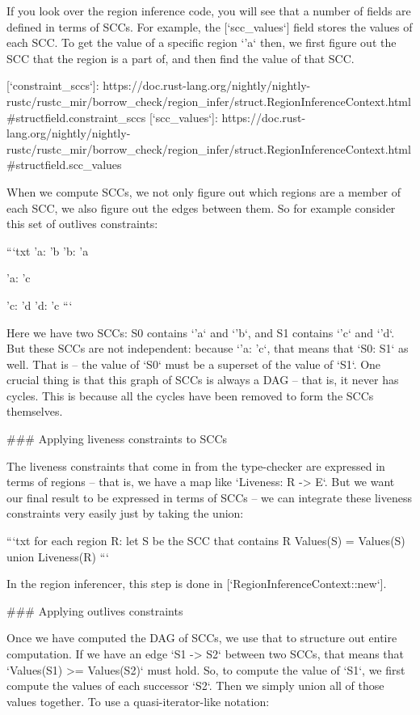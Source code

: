 \documentclass[12pt, a4paper]{article}
\begin{document}
If you look over the region inference code, you will see that a number
of fields are defined in terms of SCCs. For example, the
[`scc_values`] field stores the values of each SCC. To get the value
of a specific region `'a` then, we first figure out the SCC that the
region is a part of, and then find the value of that SCC.

[`constraint_sccs`]: https://doc.rust-lang.org/nightly/nightly-rustc/rustc_mir/borrow_check/region_infer/struct.RegionInferenceContext.html#structfield.constraint_sccs
[`scc_values`]: https://doc.rust-lang.org/nightly/nightly-rustc/rustc_mir/borrow_check/region_infer/struct.RegionInferenceContext.html#structfield.scc_values

When we compute SCCs, we not only figure out which regions are a
member of each SCC, we also figure out the edges between them. So for example
consider this set of outlives constraints:

```txt
'a: 'b
'b: 'a

'a: 'c

'c: 'd
'd: 'c
```

Here we have two SCCs: S0 contains `'a` and `'b`, and S1 contains `'c`
and `'d`.  But these SCCs are not independent: because `'a: 'c`, that
means that `S0: S1` as well. That is -- the value of `S0` must be a
superset of the value of `S1`. One crucial thing is that this graph of
SCCs is always a DAG -- that is, it never has cycles. This is because
all the cycles have been removed to form the SCCs themselves.

### Applying liveness constraints to SCCs

The liveness constraints that come in from the type-checker are
expressed in terms of regions -- that is, we have a map like
`Liveness: R -> {E}`.  But we want our final result to be expressed
in terms of SCCs -- we can integrate these liveness constraints very
easily just by taking the union:

```txt
for each region R:
  let S be the SCC that contains R
  Values(S) = Values(S) union Liveness(R)
```

In the region inferencer, this step is done in [`RegionInferenceContext::new`].

### Applying outlives constraints

Once we have computed the DAG of SCCs, we use that to structure out
entire computation. If we have an edge `S1 -> S2` between two SCCs,
that means that `Values(S1) >= Values(S2)` must hold. So, to compute
the value of `S1`, we first compute the values of each successor `S2`.
Then we simply union all of those values together. To use a
quasi-iterator-like notation:
\end{document}
